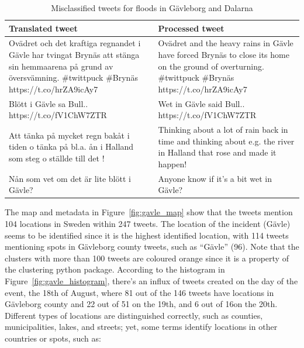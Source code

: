 \begin{table}[ht!]
  \center
  \caption{Misclassified tweets for floods in Gävleborg and Dalarna}
  \begin{tabular}{|L{7.5cm}|L{7.5cm}|}
    \hline
    Translated tweet & Processed tweet\\
    \hline
    Ovädret och det kraftiga regnandet i Gävle har tvingat Brynäs att stänga sin hemmaarena på grund av
    översvämning. \#twittpuck \#Brynäs https://t.co/hrZA9icAy7 &
    Ovädret and the heavy rains in Gävle have forced Brynäs to close its home on the ground of
    overturning. \#twittpuck \#Brynäs https://t.co/hrZA9icAy7 \\
    \hline
    Blött i Gävle sa Bull.. https://t.co/fV1ChW7ZTR &
    Wet in Gävle said Bull.. https://t.co/fV1ChW7ZTR \\
    \hline
    Att tänka på mycket regn bakåt i tiden o tänka på bl.a. ån i Halland som steg o ställde till det !&
    Thinking about a lot of rain back in time and thinking about e.g. the river in Halland that rose and
    made it happen! \\
    \hline
    Nån som vet om det är lite blött i Gävle?&
    Anyone know if it's a bit wet in Gävle? \\
    \hline
  \end{tabular}
  \label{tab:tweets_missclassified_gavle}
\end{table}

The map and metadata in Figure~\ref{fig:gavle_map} show that the tweets mention 104 locations in
Sweden within 247 tweets. The location of the incident (Gävle) seems to be identified since it is
the highest identified location, with 114 tweets mentioning spots in Gävleborg county tweets, such
as ``Gävle'' (96). Note that the clusters with more than 100 tweets are coloured orange since it is
a property of the clustering python package. According to the histogram in
Figure~\ref{fig:gavle_histogram}, there's an influx of tweets created on the day of the event, the
18th of August, where 81 out of the 146 tweets have locations in Gävleborg county and 22 out of 51
on the 19th, and 6 out of 16on the 20th. Different types of locations are distinguished correctly,
such as counties, municipalities, lakes, and streets; yet, some terms identify locations in other
countries or spots, such as:

